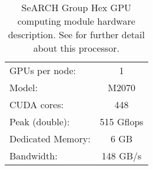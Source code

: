 \begin{table}[!htp]
	\begin{center}
		\begin{tabular}{lc}
			\hline
			GPUs per node: & 1	\\
			Model: & \tesla M2070\\
			CUDA cores: & 448	\\
			Peak (double): & 515 Gflops	\\
			\hline
			Dedicated Memory: & 6 GB	\\
			Bandwidth: & 148 GB/s\\
			\hline
		\end{tabular}
		\caption[SeARCH Group Hex GPU computing module hardware description]{SeARCH Group Hex GPU computing module hardware description. See \cite{teslaM2070} for further detail about this processor.}
		\label{tab:grouphex}
	\end{center}
\end{table}